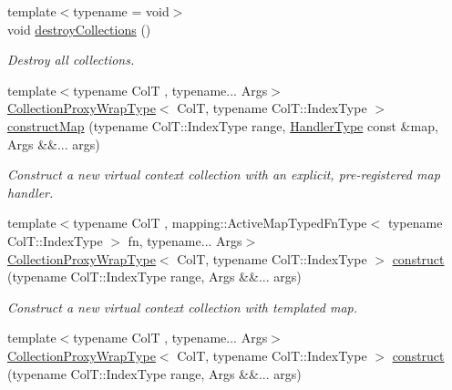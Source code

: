 \begin{DoxyCompactItemize}
{\footnotesize template$<$typename  = void$>$ }\\void \hyperlink{structvt_1_1vrt_1_1collection_1_1_collection_manager_a71865b0508bab58b6d44b44416f11983}{destroy\+Collections} ()
\begin{DoxyCompactList}\small\item\em Destroy all collections. \end{DoxyCompactList}\item 
{\footnotesize template$<$typename ColT , typename... Args$>$ }\\\hyperlink{structvt_1_1vrt_1_1collection_1_1_collection_manager_a56458ed7f9bb22b631b9b3a745f42f94}{Collection\+Proxy\+Wrap\+Type}$<$ ColT, typename Col\+T\+::\+Index\+Type $>$ \hyperlink{structvt_1_1vrt_1_1collection_1_1_collection_manager_a07aebc3fa25e2fe901eedc5db722655f}{construct\+Map} (typename Col\+T\+::\+Index\+Type range, \hyperlink{namespacevt_af64846b57dfcaf104da3ef6967917573}{Handler\+Type} const \&map, Args \&\&... args)
\begin{DoxyCompactList}\small\item\em Construct a new virtual context collection with an explicit, pre-\/registered map handler. \end{DoxyCompactList}\item 
{\footnotesize template$<$typename ColT , mapping\+::\+Active\+Map\+Typed\+Fn\+Type$<$ typename Col\+T\+::\+Index\+Type $>$ fn, typename... Args$>$ }\\\hyperlink{structvt_1_1vrt_1_1collection_1_1_collection_manager_a56458ed7f9bb22b631b9b3a745f42f94}{Collection\+Proxy\+Wrap\+Type}$<$ ColT, typename Col\+T\+::\+Index\+Type $>$ \hyperlink{structvt_1_1vrt_1_1collection_1_1_collection_manager_a4de84e9efd7a3948e3c20be549441cfd}{construct} (typename Col\+T\+::\+Index\+Type range, Args \&\&... args)
\begin{DoxyCompactList}\small\item\em Construct a new virtual context collection with templated map. \end{DoxyCompactList}\item 
{\footnotesize template$<$typename ColT , typename... Args$>$ }\\\hyperlink{structvt_1_1vrt_1_1collection_1_1_collection_manager_a56458ed7f9bb22b631b9b3a745f42f94}{Collection\+Proxy\+Wrap\+Type}$<$ ColT, typename Col\+T\+::\+Index\+Type $>$ \hyperlink{structvt_1_1vrt_1_1collection_1_1_collection_manager_a9049432725068d7ec7f664f7a8759a69}{construct} (typename Col\+T\+::\+Index\+Type range, Args \&\&... args)

\end{DoxyCompactItemize}
